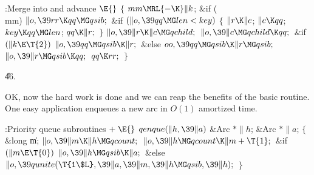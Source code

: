 \B{}:Merge  into  and advance \X${}\E{}$\6
${}\{{}$\1\6
${}\\{mm}\MRL{-{\K}}\|k{}$;\5
\&{if} (\\{mm})\1\5
${}\|o,\39\\{rr}\K\\{qq}\MG\\{qsib};{}$\2\6
\&{if} ${}(\|o,\39\\{qq}\MG\\{len}<\\{key}){}$\5
${}\{{}$\1\6
${}\|r\K\|c{}$;\5
${}\|c\K\\{qq}{}$;\5
${}\\{key}\K\\{qq}\MG\\{len}{}$;\5
${}\\{qq}\K\|r;{}$\6
\4${}\}{}$\2\6
${}\|o,\39\|r\K\|c\MG\\{qchild};{}$\6
${}\|o,\39\|c\MG\\{qchild}\K\\{qq};{}$\6
\&{if} ${}(\|k\E\T{2}){}$\1\5
${}\|o,\39\\{qq}\MG\\{qsib}\K\|r;{}$\2\6
\&{else}\1\5
${}\\{oo},\39\\{qq}\MG\\{qsib}\K\|r\MG\\{qsib};{}$\2\6
${}\|o,\39\|r\MG\\{qsib}\K\\{qq};{}$\6
${}\\{qq}\K\\{rr};{}$\6
\4${}\}{}$\2\par
\U46.\fi

OK, now the hard work is done and we can reap the benefits of the
basic  routine. One easy application enqueues a new arc
in $O(1)$ amortized time.

\Y\B\4:Priority queue subroutines\X${}\mathrel+\E{}$\6
\1\1${}\\{qenque}(\|h,\39\|a){}$\6
\&{Arc} ${}{*}\|h{}$;\6
\&{Arc} ${}{*}\|a{}$;\2\2\6
${}\{{}$\5
\1\&{long} \|m;\7
${}\|o,\39\|m\K\|h\MG\\{qcount};{}$\6
${}\|o,\39\|h\MG\\{qcount}\K\|m+\T{1};{}$\6
\&{if} ${}(\|m\E\T{0}){}$\1\5
${}\|o,\39\|h\MG\\{qsib}\K\|a;{}$\2\6
\&{else}\1\5
${}\|o,\39\\{qunite}(\T{1\$L},\39\|a,\39\|m,\39\|h\MG\\{qsib},\39\|h);{}$\2\6
\4${}\}{}$\2\par
\fi

